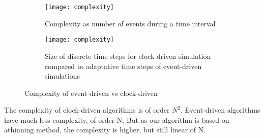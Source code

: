 \documentclass{report}
\begin{document}
	\begin{figure}
		\begin{subfigure}{\textwidth}
			\centering\texttt{[image: complexity]}
			\caption{Complexity as number of events during a time interval}
		\end{subfigure}
		\begin{subfigure}{\textwidth}
			\centering\texttt{[image: complexity]}
			\caption{Size of discrete time steps for clock-driven simulation compared to adaptative time steps of event-driven simulations}
		\end{subfigure}
		\caption{Complexity of event-driven vs clock-driven}
	\end{figure}
	The complexity of clock-driven algorithms is of order $N^2$. Event-driven algorithms have much less complexity, of order N. But as our algorithm is based on athinning method, the complexity is higher, but still linear of N.
\end{document}
